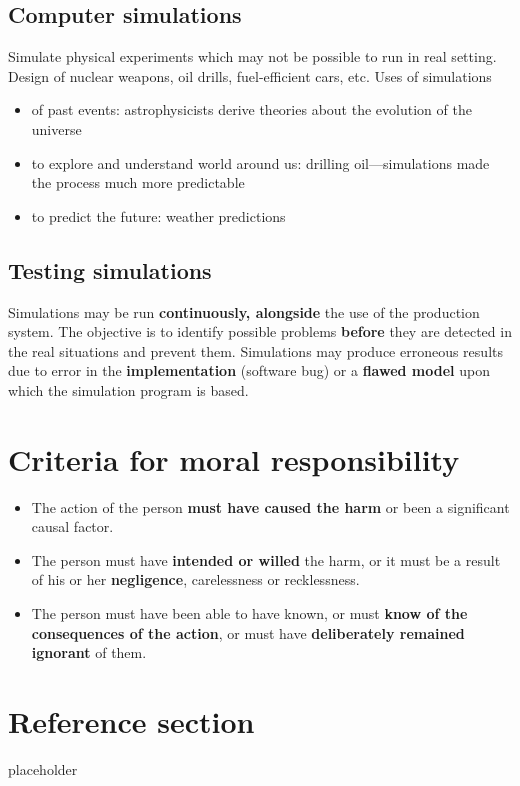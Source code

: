 \documentclass{article}
\begin{document}
\subsection{Computer simulations}
\begin{flushleft}
Simulate physical experiments which may not be possible to run in real setting. Design of nuclear weapons, oil drills, fuel-efficient cars, etc. Uses of simulations
\begin{itemize}  
  \item of past events: astrophysicists derive theories about the evolution of the universe
  \item to explore and understand world around us: drilling oil—simulations made the process much more predictable
  \item to predict the future: weather predictions
\end{itemize}
\end{flushleft}

\subsection{Testing simulations}

\begin{flushleft}
Simulations may be run \textbf{continuously, alongside} the use of the production system. The objective is to identify possible problems \textbf{before} they are detected in the real situations and prevent them. Simulations may produce erroneous results due to error in the \textbf{implementation} (software bug) or a \textbf{flawed model} upon which the simulation program is based.
\end{flushleft}

\section{Criteria for moral responsibility}

\begin{itemize}
  \item The action of the person \textbf{must have caused the harm} or been a significant causal factor. 
  \item The person must have \textbf{intended or willed} the harm, or it must be a result of his or her \textbf{negligence}, carelessness or recklessness. 
  \item The person must have been able to have known, or must \textbf{know of the consequences of the action}, or must have \textbf{deliberately remained ignorant} of them.
\end{itemize}

\pagebreak
\section*{Reference section} \label{sec:reference}
\begin{description}
	\item[placeholder] \hfill \\
\end{description}
\end{document}
